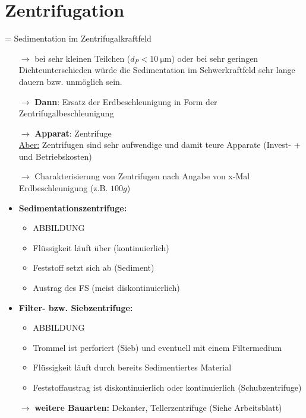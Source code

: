 \section{Zentrifugation}
= Sedimentation im Zentrifugalkraftfeld
\begin{itemize}
	\item [$\rightarrow$] bei sehr kleinen Teilchen ($d_P<\SI{10}{\micro \meter}$) oder bei sehr geringen Dichteunterschieden würde die Sedimentation im Schwerkraftfeld sehr lange dauern bzw. unmöglich sein.
	\item [$\rightarrow$] \textbf{Dann}: Ersatz der Erdbeschleunigung in Form der Zentrifugalbeschleunigung
	\item [$\rightarrow$] \textbf{Apparat}: Zentrifuge\\
		\underline{Aber:} Zentrifugen sind sehr aufwendige und damit teure Apparate (Invest- + und Betriebskosten)
	\item [$\rightarrow$] Charakterisierung von Zentrifugen nach Angabe von x-Mal Erdbeschleunigung (z.B. $100g$)
\end{itemize}

\begin{itemize}
	\item \textbf{Sedimentationszentrifuge:}
			\begin{itemize}
				\item 	ABBILDUNG
				\item Flüssigkeit läuft über (kontinuierlich)
				\item Feststoff setzt sich ab (Sediment)
				\item Austrag des FS (meist diskontinuierlich)
			\end{itemize}
	\item \textbf{Filter- bzw. Siebzentrifuge:}
		\begin{itemize}
			\item ABBILDUNG
			\item Trommel ist perforiert (Sieb) und eventuell mit einem Filtermedium
			\item Flüssigkeit läuft durch bereits Sedimentiertes Material
			\item Feststoffaustrag ist diskontinuierlich oder kontinuierlich (Schubzentrifuge)
		\end{itemize}
\end{itemize}

\begin{itemize}
	\item [$\rightarrow$] \textbf{weitere Bauarten:} Dekanter, Tellerzentrifuge (Siehe Arbeitsblatt)
\end{itemize}
